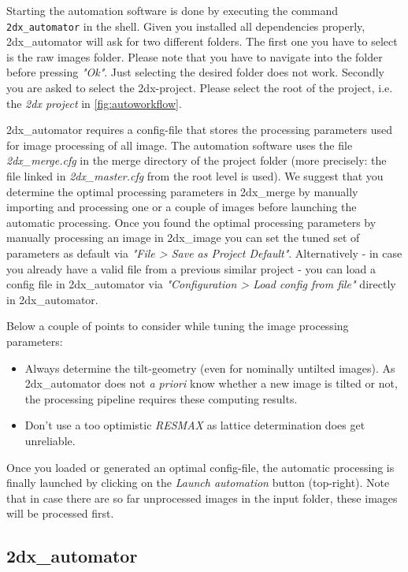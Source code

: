 Starting the automation software is done by executing the command \texttt{2dx\_automator} in the shell. Given you installed all dependencies properly, 2dx\_automator will ask for two different folders. The first one you have to select is the raw images folder. Please note that you have to navigate into the folder before pressing \textit{"Ok"}. Just selecting the desired folder does not work. Secondly you are asked to select the 2dx-project. Please select the root of the project, i.e. the \textit{2dx project} in \autoref{fig:autoworkflow}.

2dx\_automator requires a config-file that stores the processing parameters used for image processing of all image. The automation software uses the file \textit{2dx\_merge.cfg} in the merge directory of the project folder (more precisely: the file linked in \textit{2dx\_master.cfg} from the root level is used). We suggest that you determine the optimal processing parameters in 2dx\_merge by manually importing and processing one or a couple of images before launching the automatic processing. Once you found the optimal processing parameters by manually processing an image in 2dx\_image you can set the tuned set of parameters as default via \textit{"File > Save as Project Default"}. Alternatively - in case you already have a valid file from a previous similar project - you can load a config file in 2dx\_automator via \textit{"Configuration > Load config from file"} directly in 2dx\_automator.

Below a couple of points to consider while tuning the image processing parameters:
\begin{itemize}
	\item Always determine the tilt-geometry (even for nominally untilted images). As 2dx\_automator does not \textit{a priori} know whether a new image is tilted or not, the processing pipeline requires these computing results.
	\item Don't use a too optimistic \textit{RESMAX} as lattice determination does get unreliable. 
\end{itemize}

Once you loaded or generated an optimal config-file, the  automatic processing is finally launched by clicking on the \textit{Launch automation} button (top-right). Note that in case there are so far unprocessed images in the input folder, these images will be processed first.

\subsection{2dx\_automator}


